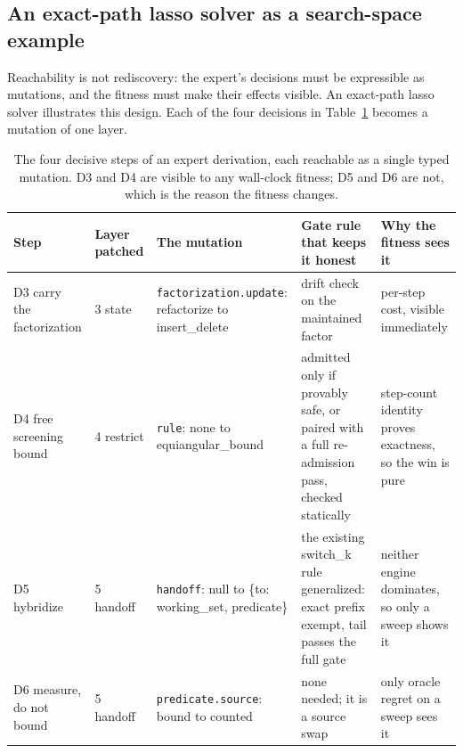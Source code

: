 
\subsection{An exact-path lasso solver as a search-space example}
\label{sec:method:rediscover}

Reachability is not rediscovery: the expert's decisions must be expressible
as mutations, and the fitness must make their effects visible. An exact-path
lasso solver illustrates this design. Each of the four decisions in
Table~\ref{tab:rediscover} becomes a mutation of one layer.

\begin{table}[htbp]\centering\footnotesize
\caption{The four decisive steps of an expert derivation, each reachable
as a single typed mutation. D3 and D4 are visible to any wall-clock
fitness; D5 and D6 are not, which is the reason the fitness changes.}
\label{tab:rediscover}
\begin{tabular}{@{}p{1.42cm}p{1.24cm}p{3.05cm}p{3.30cm}p{3.04cm}@{}}
\toprule
Step & Layer patched & The mutation & Gate rule that keeps it honest &
Why the fitness sees it \\
\midrule
D3 carry the factorization &
3 state &
\texttt{factorization.\allowbreak update}: refactorize to insert\_\allowbreak delete &
drift check on the maintained factor &
per-step cost, visible immediately \\
\addlinespace
D4 free screening bound &
4 restrict &
\texttt{rule}: none to equiangular\_\allowbreak bound &
admitted only if provably safe, or paired with a full re-admission pass,
checked statically &
step-count identity proves exactness, so the win is pure \\
\addlinespace
D5 hybridize &
5 handoff &
\texttt{handoff}: null to \{to: working\_\allowbreak set, predicate\} &
the existing switch\_k rule generalized: exact prefix exempt, tail passes
the full gate &
neither engine dominates, so only a sweep shows it \\
\addlinespace
D6 measure, do not bound &
5 handoff &
\texttt{predicate.\allowbreak source}: bound to counted &
none needed; it is a source swap &
only oracle regret on a sweep sees it \\
\bottomrule
\end{tabular}
\end{table}

